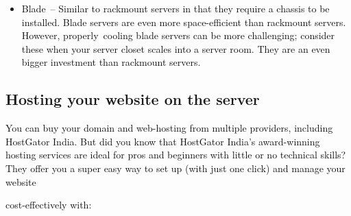 \documentclass[12pt]{report}
\renewcommand{\_}{\kern-1.5pt\textunderscore\kern-1.5pt}
\begin{document}
\begin{itemize}
	\item {\fontsize{13pt}{15.6pt}\selectfont \textcolor[HTML]{0D0D0D}{Blade\ – Similar to rackmount servers in that they require a chassis to be  installed. Blade servers are even more space-eﬃcient than rackmount servers. However, properly\ cooling blade servers can be more challenging; consider  these when your server closet scales into a server room. They are an even bigger investment than rackmount servers.}\par}\par


\vspace{\baselineskip}
\end{itemize}\subsection{Hosting your website on the server}
 \tabto{0.59in} \textcolor[HTML]{0D0D0D}{You can buy your domain and web-hosting from multiple providers, including HostGator India. But did you know that HostGator India’s award-winning hosting services are ideal for pros and beginners with little or no technical skills? They oﬀer you a super easy way to set up (with just one click) and manage your website}\par

 \tabto{0.59in} \textcolor[HTML]{0D0D0D}{cost-eﬀectively with:}\par
\end{document}

